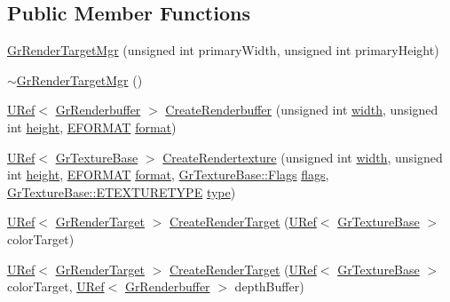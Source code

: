\begin{CompactItemize}
\subsection*{Public Member Functions}
\begin{CompactItemize}
\item 
\hyperlink{class_gr_render_target_mgr_5f555b4570db0e232b60580462db5344}{GrRenderTargetMgr} (unsigned int primaryWidth, unsigned int primaryHeight)
\item 
\hyperlink{class_gr_render_target_mgr_850e21f4c7588233f838e1132cbff3cc}{$\sim$GrRenderTargetMgr} ()
\item 
\hyperlink{class_u_ref}{URef}$<$ \hyperlink{class_gr_renderbuffer}{GrRenderbuffer} $>$ \hyperlink{class_gr_render_target_mgr_fabad7a065e67c6bd8f04e98e1501061}{CreateRenderbuffer} (unsigned int \hyperlink{wglext_8h_e6531b1788ca42a9ae8155b0c52e7630}{width}, unsigned int \hyperlink{wglext_8h_b2e63df950c3789599e1e43f477bc9e3}{height}, \hyperlink{class_gr_render_target_mgr_66d0ebb49e9781283d824f19f4bbc3f6}{EFORMAT} \hyperlink{glext__bak_8h_e2d3db041c6004a67047659b42f73a44}{format})
\item 
\hyperlink{class_u_ref}{URef}$<$ \hyperlink{class_gr_texture_base}{GrTextureBase} $>$ \hyperlink{class_gr_render_target_mgr_7e1d7957a2167cd17b678a44da653898}{CreateRendertexture} (unsigned int \hyperlink{wglext_8h_e6531b1788ca42a9ae8155b0c52e7630}{width}, unsigned int \hyperlink{wglext_8h_b2e63df950c3789599e1e43f477bc9e3}{height}, \hyperlink{class_gr_render_target_mgr_66d0ebb49e9781283d824f19f4bbc3f6}{EFORMAT} \hyperlink{glext__bak_8h_e2d3db041c6004a67047659b42f73a44}{format}, \hyperlink{class_gr_texture_base_bee6ecbc7a70ea5f2acab8341a9696b5}{GrTextureBase::Flags} \hyperlink{_u_t_message_8h_0a3c0b351ab09281b662a9ff4f900a53}{flags}, \hyperlink{class_gr_texture_base_5ce3676de03c3c565a9a0995334e5308}{GrTextureBase::ETEXTURETYPE} \hyperlink{glext__bak_8h_7d05960f4f1c1b11f3177dc963a45d86}{type})
\item 
\hyperlink{class_u_ref}{URef}$<$ \hyperlink{class_gr_render_target}{GrRenderTarget} $>$ \hyperlink{class_gr_render_target_mgr_2dc9cb29f5f88c355eaab0938c0f355d}{CreateRenderTarget} (\hyperlink{class_u_ref}{URef}$<$ \hyperlink{class_gr_texture_base}{GrTextureBase} $>$ colorTarget)
\item 
\hyperlink{class_u_ref}{URef}$<$ \hyperlink{class_gr_render_target}{GrRenderTarget} $>$ \hyperlink{class_gr_render_target_mgr_f2943fd9b726ca96797aeb8f4cf534a7}{CreateRenderTarget} (\hyperlink{class_u_ref}{URef}$<$ \hyperlink{class_gr_texture_base}{GrTextureBase} $>$ colorTarget, \hyperlink{class_u_ref}{URef}$<$ \hyperlink{class_gr_renderbuffer}{GrRenderbuffer} $>$ depthBuffer)

\end{CompactItemize}
\end{CompactItemize}
